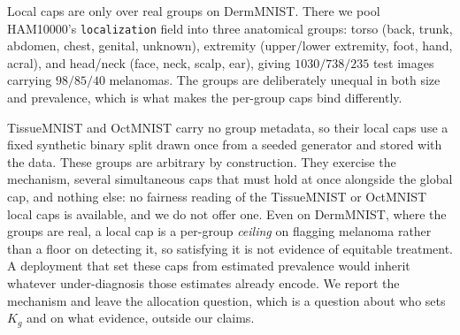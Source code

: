 \documentclass[letterpaper]{article}
\begin{document}
Local caps are only over real groups on DermMNIST. There we pool HAM10000's
\texttt{localization} field into three anatomical groups: torso (back, trunk, abdomen,
chest, genital, unknown), extremity (upper/lower extremity, foot, hand, acral), and
head/neck (face, neck, scalp, ear), giving $1030/738/235$ test images carrying $98/85/40$
melanomas. The groups are deliberately unequal in both size and prevalence, which is what
makes the per-group caps bind differently.

TissueMNIST and OctMNIST carry no group metadata, so their local caps use a fixed
synthetic binary split drawn once from a seeded generator and stored with the data. These
groups are arbitrary by construction. They exercise the mechanism, several simultaneous
caps that must hold at once alongside the global cap, and nothing else: no fairness
reading of the TissueMNIST or OctMNIST local caps is available, and we do not offer one.
Even on DermMNIST, where the groups are real, a local cap is a per-group \emph{ceiling}
on flagging melanoma rather than a floor on detecting it, so satisfying it is not
evidence of equitable treatment. A deployment that set these caps from estimated
prevalence would inherit whatever under-diagnosis those estimates already encode. We
report the mechanism and leave the allocation question, which is a question about who
sets $K_g$ and on what evidence, outside our claims.

{\small
}
\end{document}
